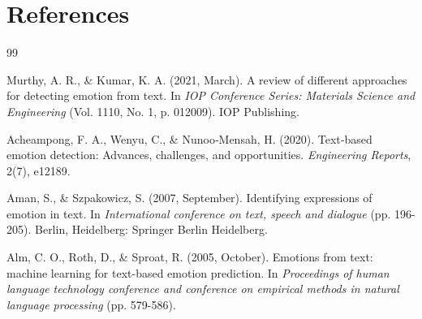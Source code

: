 \documentclass{article}
\begin{document}




\section{References}
\begin{thebibliography}{99} %

Murthy, A. R., \& Kumar, K. A. (2021, March). A review of different approaches for detecting emotion from text. In \textit{IOP Conference Series: Materials Science and Engineering} (Vol. 1110, No. 1, p. 012009). IOP Publishing.

Acheampong, F. A., Wenyu, C., \& Nunoo‐Mensah, H. (2020). Text‐based emotion detection: Advances, challenges, and opportunities. \textit{Engineering Reports}, 2(7), e12189.

Aman, S., \& Szpakowicz, S. (2007, September). Identifying expressions of emotion in text. In \textit{International conference on text, speech and dialogue} (pp. 196-205). Berlin, Heidelberg: Springer Berlin Heidelberg.

Alm, C. O., Roth, D., \& Sproat, R. (2005, October). Emotions from text: machine learning for text-based emotion prediction. In \textit{Proceedings of human language technology conference and conference on empirical methods in natural language processing} (pp. 579-586).

\end{thebibliography}
\end{document}
